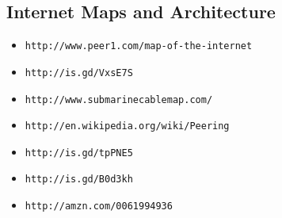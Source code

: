 \documentclass[xga]{xdvislides}
\begin{document}
%
%
%
%
%

\subsection{Internet Maps and Architecture}
\begin{itemize}
	\item \verb+http://www.peer1.com/map-of-the-internet+
	\item \verb+http://is.gd/VxsE7S+
	\item \verb+http://www.submarinecablemap.com/+
	\item \verb+http://en.wikipedia.org/wiki/Peering+
	\item \verb+http://is.gd/tpPNE5+
	\item \verb+http://is.gd/B0d3kh+
	\item \verb+http://amzn.com/0061994936+
\end{itemize}
\end{document}
